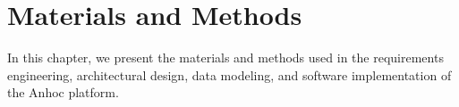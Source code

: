 \chapter{Materials and Methods}

In this chapter, we present the materials and methods used in the requirements engineering, architectural design, data modeling, and software implementation of the Anhoc platform.




